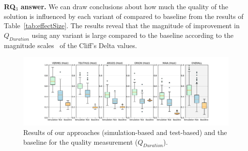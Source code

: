 \textbf{RQ$_3$ answer. }
We can draw conclusions about how much the quality of the solution is influenced by each variant of \ApproachName{} compared to baseline from the results of Table~\ref{tab:effectSize}. The results reveal that the magnitude of improvement in $Q_{Duration}$ using any variant is large compared to the baseline according to the magnitude scales~\cite{Romano2006} of the Cliff's Delta values.


\begin{figure}[ht!]
    \centering
    \includegraphics[width=\textwidth]{Figures/Imhotep_with_legend_and_oracle_average-v4.pdf}
    \caption{Results of our \ApproachName{} approaches (simulation-based and test-based) and the baseline for the quality measurement ($Q_{Duration}$).}
    \label{fig:results}
\end{figure}






